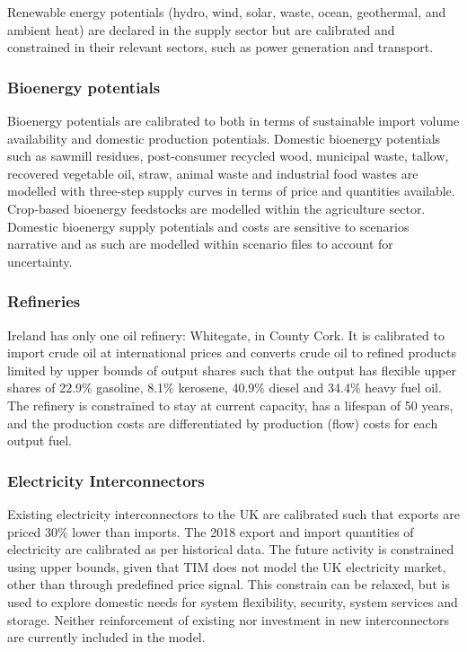 \documentclass[gmd,manuscript]{copernicus}
\begin{document}
Renewable energy potentials (hydro, wind, solar, waste, ocean, geothermal, and ambient heat) are declared in the supply sector but are calibrated and constrained in their relevant sectors, such as power generation and transport.

\subsubsection{Bioenergy potentials}
Bioenergy potentials are calibrated to \citet{SEAI2015} both in terms of sustainable import volume availability and domestic production potentials. Domestic bioenergy potentials such as sawmill residues, post-consumer recycled wood, municipal waste, tallow, recovered vegetable oil, straw, animal waste and industrial food wastes are modelled with three-step supply curves in terms of price and quantities available. Crop-based bioenergy feedstocks are modelled within the agriculture sector. Domestic bioenergy supply potentials and costs are sensitive to scenarios narrative and as such are modelled within scenario files to account for uncertainty.

\subsubsection{Refineries}
Ireland has only one oil refinery: Whitegate, in County Cork. It is calibrated to import crude oil at international prices and converts crude oil to refined products limited by upper bounds of output shares such that the output has flexible upper shares of 22.9\% gasoline, 8.1\% kerosene, 40.9\% diesel and 34.4\% heavy fuel oil. The refinery is constrained to stay at current capacity, has a lifespan of 50 years, and the production costs are differentiated by production (flow) costs for each output fuel.

\subsubsection{Electricity Interconnectors}
Existing electricity interconnectors to the UK are calibrated such that exports are priced 30\% lower than imports. The 2018 export and import quantities of electricity are calibrated as per historical data. The future activity is constrained using upper bounds, given that TIM does not model the UK electricity market, other than through predefined price signal. This constrain can be relaxed, but is used to explore domestic needs for system flexibility, security, system services and storage. Neither reinforcement of existing nor investment in new interconnectors are currently included in the model. 
\end{document}
